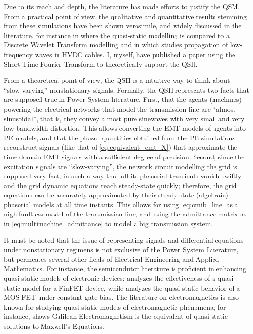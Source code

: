	Due to its reach and depth, the literature has made efforts to justify the QSM. From a practical point of view, the qualitative and quantitative results stemming from these simulations have been shown verosimile, and widely discussed in the literature, for instance in \cite{zhuDWTBasedAggregatedLoad2018} where the quasi-static modelling is compared to a Discrete Wavelet Transform modelling and in \cite{gustafssonWavePropagationCharacteristics2015} which studies propagation of low-frequency waves in HVDC cables. I, myself, have published a paper  using the Short-Time Fourier Transform to theoretically support the QSH.

	From a theoretical point of view, the QSH is a intuitive way to think about ``slow-varying'' nonstationary signals. Formally, the QSH represents two facts that are supposed true in Power System literature. First, that the agents (machines) powering the electrical networks that model the transmission line are ``almost sinusoidal'', that is, they convey almost pure sinewaves with very small and very low bandwidth distortion. This allows converting the EMT models of agents into PE models, and that the phasor quantities obtained from the PE simulations reconstruct signals (like that of \eqref{eq:equivalent_emt_X}) that approximate the time domain EMT signals with a sufficient degree of precision. Second, since the excitation signals are ``slow-varying'', the network circuit modelling the grid is supposed very fast, in such a way that all its phasorial transients vanish swiftly and the grid dynamic equations reach steady-state quickly; therefore, the grid equations can be accurately approximated by their steady-state (algebraic) phasorial models at all time instants. This allows for using \eqref{eq:omib_line} as a nigh-faultless model of the transmission line, and using the admittance matrix as in \eqref{eq:multimachine_admittance} to model a big transmission system.

	It must be noted that the issue of representing signals and differential equations under nonstationary regimens is not exclusive of the Power System Literature, but permeates several other fields of Electrical Engineering and Applied Mathematics. For instance, the semicondutor literature is proficient in enhancing quasi-static models of electronic devices: \cite{crupiAnalysisQuasistaticAssumption2006} analyzes the effectiveness of a quasi-static model for a FinFET device, while \cite{allmanQuasistaticResponseMOS1981} analyzes the quasi-static behavior of a MOS FET under constant gate bias. The literature on electromagnetics is also known for studying quasi-static models of electromagnetic phenomena; for instance, \cite{mazauricGalileanCovarianceMaxwell2014} shows Galilean Electromagnetism is the equivalent of quasi-static solutions to Maxwell's Equations.

